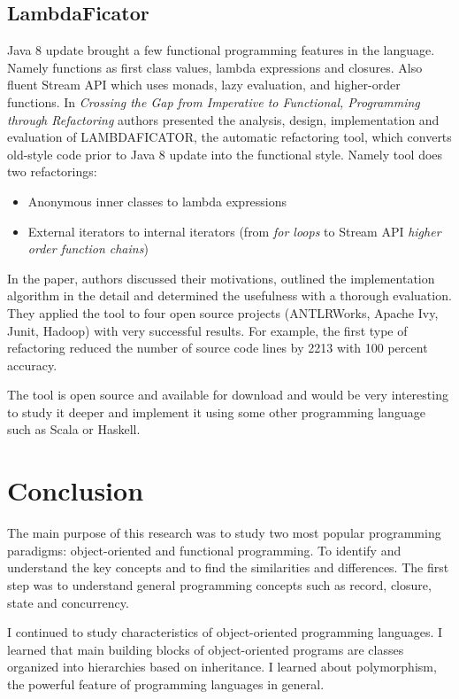 \documentclass[12pt,twoside,a4paper]{report}
\begin{document}
\subsection{LambdaFicator}\label{2.5.3}
Java 8 update brought a few functional programming features in the language. Namely functions as first class values, lambda expressions and closures. Also fluent Stream API which uses monads, lazy evaluation, and higher-order functions. In \emph{Crossing the Gap from Imperative to Functional, Programming through Refactoring}\cite{15} authors presented the analysis, design, implementation and evaluation of LAMBDAFICATOR, the automatic refactoring tool, which converts old-style code prior to Java 8 update into the functional style. Namely tool does two refactorings:

\begin{itemize}\itemsep1pt \parskip0pt 
\item Anonymous inner classes to lambda expressions
\item External iterators to internal iterators (from \textit{for loops} to Stream API \textit{higher order function chains})
\end{itemize}

In the paper, authors discussed their motivations, outlined the implementation algorithm in the detail and determined the usefulness with a thorough evaluation. They applied the tool to four open source projects (ANTLRWorks, Apache Ivy, Junit, Hadoop) with very successful results. For example, the first type of refactoring reduced the number of source code lines by 2213 with 100 percent accuracy.\par
The tool is open source and available for download and would be very interesting to study it deeper and implement it using some other programming language such as Scala or Haskell.

\section{Conclusion}\label{2.6}
The main purpose of this research was to study two most popular programming paradigms: object-oriented and functional programming. To identify and understand the key concepts and to
find the similarities and differences. The first step was to understand general programming concepts such as record, closure, state and concurrency. 

I continued to study characteristics of object-oriented programming languages. I learned that main building blocks of object-oriented programs are classes organized into hierarchies based on inheritance. I learned about polymorphism, the powerful feature of programming languages in general. 
\end{document}
